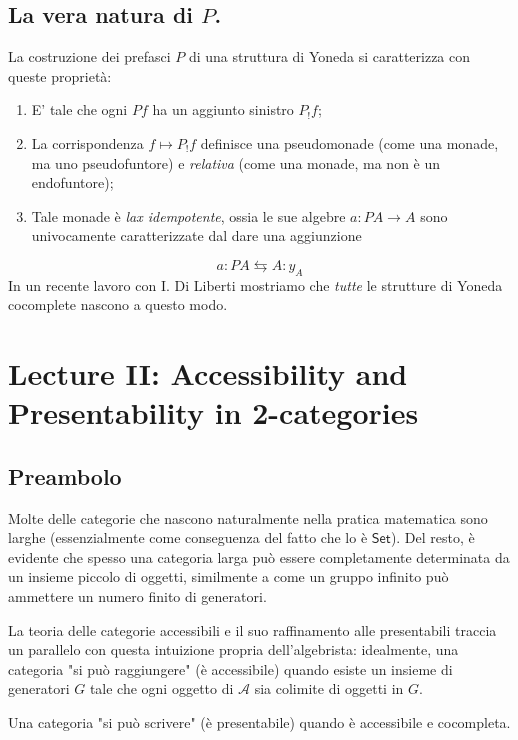 \documentclass[11pt]{article}
\def\Set{\mathsf{Set}}
\theoremstyle{reference}
\begin{document}
\subsection{La vera natura di \(P\).}
\label{sec:org9705d81}

La costruzione dei prefasci \(P\) di una struttura di Yoneda si caratterizza con queste proprietà:

\begin{enumerate}
\item E' tale che ogni \(Pf\) ha un aggiunto sinistro \(P_!f\);
\item La corrispondenza \(f\mapsto P_!f\) definisce una pseudomonade (come una monade, ma uno pseudofuntore) e \emph{relativa} (come una monade, ma non è un endofuntore);
\item Tale monade è \emph{lax idempotente}, ossia le sue algebre \(a : PA\to A\) sono univocamente caratterizzate dal dare una aggiunzione
\end{enumerate}
\[
a : PA \leftrightarrows A : y_A
\]
In un recente lavoro con I. Di Liberti mostriamo che \emph{tutte} le strutture di Yoneda cocomplete nascono a questo modo.

\section{Lecture II: Accessibility and Presentability in 2-categories}
\label{sec:orgf1f1879}

\subsection{Preambolo}
\label{sec:org7e6bbb1}

Molte delle categorie che nascono naturalmente nella pratica
matematica sono larghe (essenzialmente come conseguenza del
fatto che lo è \(\Set\)). Del resto, è evidente che spesso una
categoria larga può essere completamente determinata da un
insieme piccolo di oggetti, similmente a come un gruppo
infinito può ammettere un numero finito di generatori.

La teoria delle categorie accessibili e il suo raffinamento
alle presentabili traccia un parallelo con questa intuizione
propria dell'algebrista: idealmente, una categoria "si può
raggiungere" (è accessibile) quando esiste un insieme di
generatori \(G\) tale che ogni oggetto di \(\mathcal A\) sia
colimite di oggetti in \(G\).

Una categoria "si può scrivere" (è presentabile) quando è
accessibile e cocompleta. 
\end{document}
